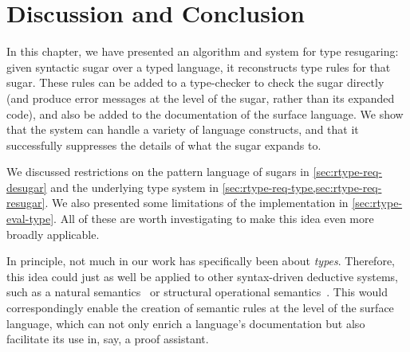 \section{Discussion and Conclusion}

In this chapter, we have presented an algorithm and system for type resugaring: given
syntactic sugar over a typed language, it reconstructs type rules for
that sugar. These rules can be added to a type-checker to check the
sugar directly (and produce error messages at the level of the sugar,
rather than its expanded code), and also be added to the documentation
of the surface language. We show that the system can handle a variety
of language constructs, and that it successfully suppresses the
details of what the sugar expands to.

We discussed restrictions on the pattern language of sugars in \cref{sec:rtype-req-desugar}
and the underlying type system in \cref{sec:rtype-req-type,sec:rtype-req-resugar}. We also presented
some limitations of the implementation in \cref{sec:rtype-eval-type}. All of
these are worth investigating to make this idea even more broadly
applicable.

In principle, not much in our work has specifically been about
\emph{types}. Therefore, this idea could just as well be applied to
other syntax-driven deductive systems, such as a natural
semantics~\cite{gk:natural-semantics}
or structural operational semantics~\cite{gdp:struct-op-sem}. This would
correspondingly enable the creation of semantic rules at the level of
the surface language, which can not only enrich a language's
documentation but also facilitate its use in, say, a proof assistant.

